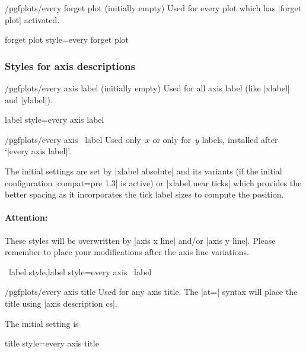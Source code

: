 \begin{stylekey}{/pgfplots/every forget plot (initially empty)}
 Used for every plot which has |forget plot| activated.
\end{stylekey}

\pgfplotsshortstylekey forget plot style=every forget plot\pgfeov

\subsubsection*{Styles for axis descriptions}

\begin{stylekey}{/pgfplots/every axis label (initially empty)}
 Used for all axis label (like |xlabel| and |ylabel|).
\end{stylekey}

\pgfplotsshortstylekey label style=every axis label\pgfeov

\begin{xystylekey}{/pgfplots/every axis \x\ label}
 Used only~$x$ or only for~$y$ labels, installed after `|every axis label|'.

 The initial settings are set by |xlabel absolute| and its variants (if the initial configuration |compat=pre 1.3| is active) or |xlabel near ticks| which provides the better spacing as it incorporates the tick label sizes to compute the position.

\paragraph{Attention:} These styles will be overwritten by |axis x line| and/or |axis y line|. Please remember to place your modifications after the axis line variations.
\end{xystylekey}

\pgfplotsshortxystylekeys \x\ label style,\x label style=every axis \x\ label\pgfeov

\begin{stylekey}{/pgfplots/every axis title}
 Used for any axis title. The |at=| syntax will place the title using |axis description cs|.

The initial setting is
\begin{codeexample}
\end{codeexample}
\end{stylekey}

\pgfplotsshortstylekey title style=every axis title\pgfeov

